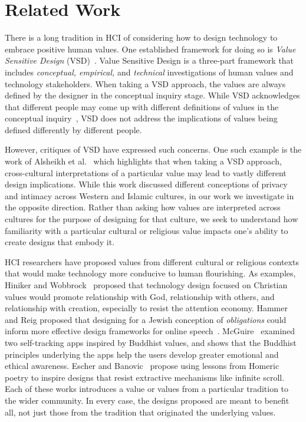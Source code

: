 \section{Related Work}
There is a long tradition in HCI of considering how to design technology to embrace positive human values. One established framework for doing so is \textit{Value Sensitive Design} (VSD)~\cite{friedman2019value}. Value Sensitive Design is a three-part framework that includes \textit{conceptual, empirical,} and \textit{technical} investigations of human values and technology stakeholders. When taking a VSD approach, the values are always defined by the designer in the conceptual inquiry stage. While VSD acknowledges that different people may come up with different definitions of values in the conceptual inquiry~\cite{friedman2013value}, VSD does not address the implications of values being defined differently by different people.

However, critiques of VSD have expressed such concerns. One such example is the work of Alsheikh et al.~\cite{alsheikh2011whose} which highlights that when taking a VSD approach, cross-cultural interpretations of a particular value may lead to vastly different design implications. While this work discussed different conceptions of privacy and intimacy across Western and Islamic cultures, in our work we investigate in the opposite direction. Rather than asking how values are interpreted across cultures for the purpose of designing for that culture, we seek to understand how familiarity with a particular cultural or religious value impacts one's ability to create designs that embody it.

HCI researchers have proposed values from different cultural or religious contexts that would make technology more conducive to human flourishing. As examples, Hiniker and Wobbrock~\cite{hiniker2022reclaiming} proposed that technology design focused on Christian values would promote relationship with God, relationship with others, and relationship with creation, especially to resist the attention economy. Hammer and Reig proposed that designing for a Jewish conception of \textit{obligations} could inform more effective design frameworks for online speech~\cite{hammer2022individual}. McGuire~\cite{mcguire2020buddhist} examined two self-tracking apps inspired by Buddhist values, and shows that the Buddhist principles underlying the apps help the users develop greater emotional and ethical awareness. Escher and Banovic~\cite{escher2024hexing} propose using lessons from Homeric poetry to inspire designs that resist extractive mechanisms like infinite scroll. Each of these works introduces a value or values from a particular tradition to the wider community. In every case, the designs proposed are meant to benefit all, not just those from the tradition that originated the underlying values.